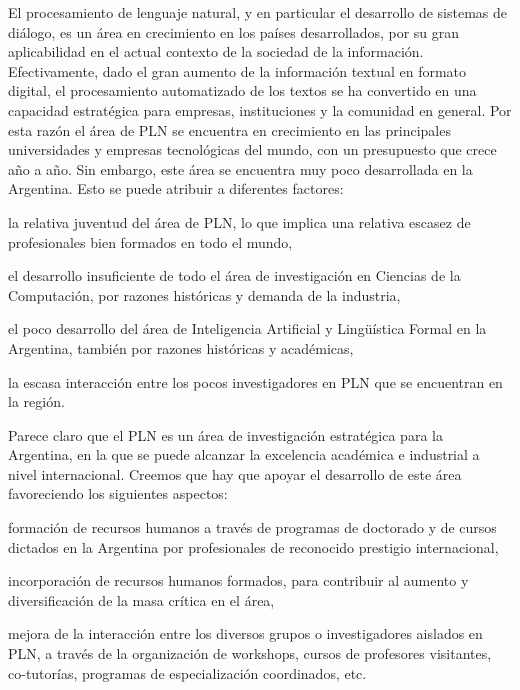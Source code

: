 
El procesamiento de lenguaje natural, y en particular el
desarrollo de sistemas de di\'alogo, es un \'area en crecimiento
en los pa\'ises desarrollados, por su gran aplicabilidad en el
actual contexto de la sociedad de la informaci\'on. Efectivamente,
dado el gran aumento de la informaci\'on textual en formato
digital, el procesamiento automatizado de los textos se ha
convertido en una capacidad estrat\'egica para empresas,
instituciones y la comunidad en general. Por esta raz\'on
el \'area de PLN se encuentra en crecimiento en las principales
universidades y empresas tecnol\'ogicas del mundo, con un
presupuesto que crece a\~no a a\~no. Sin embargo, 
este \'area se encuentra muy poco desarrollada en la Argentina. Esto se puede
atribuir a diferentes factores:

\begin{myitemize}
\item la relativa juventud del \'area de PLN, lo que implica una relativa escasez de profesionales bien formados en todo el mundo,
\item el desarrollo insuficiente de todo el \'area de investigaci\'on en Ciencias de la Computaci\'on, por razones hist\'oricas y demanda de la industria,
\item el poco desarrollo del \'area de Inteligencia Artificial y
Ling\"u\'istica Formal en la Argentina, tambi\'en por razones hist\'oricas
y acad\'emicas,
\item la escasa interacci\'on entre los pocos investigadores en PLN que se encuentran en la regi\'on.
\end{myitemize}

Parece claro que el PLN es un \'area de investigaci\'on estrat\'egica
para la Argentina, en la que se puede alcanzar la excelencia acad\'emica
e industrial a nivel internacional. Creemos que hay que apoyar el
desarrollo de este \'area favoreciendo los siguientes aspectos:

\begin{myitemize}
\item formaci\'on de recursos humanos a trav\'es
de programas de doctorado y de cursos dictados en la Argentina por profesionales de
reconocido prestigio internacional,

\item incorporaci\'on de recursos humanos formados, para contribuir
al aumento y diversificaci\'on de la masa cr\'itica en el \'area,

\item mejora de la interacci\'on entre los diversos grupos o investigadores aislados en PLN, a
trav\'es de la organizaci\'on de workshops, cursos de profesores visitantes, co-tutor\'ias,
programas de especializaci\'on coordinados, etc.
\end{myitemize}

